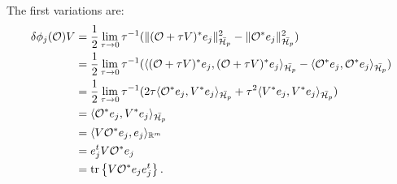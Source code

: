 \documentclass{amsart}
\numberwithin{equation}{section}
\providecommand{\DIFaddbegin}{} %
\providecommand{\DIFaddend}{} %
\providecommand{\DIFdelbegin}{} %
\providecommand{\DIFdelend}{} %
\begin{document}
\DIFaddend The first variations are:
\DIFdelbegin %
\DIFdelend \DIFaddbegin \begin{align*}
  \delta \phi_j(\mathcal{O})V  
  &= \frac12\lim_{\tau \to 0}\tau^{-1}
  ( \|(\mathcal{O} + \tau V)^*e_j \|_{\bar{\mathcal{H}_p}}^2 - \|\mathcal{O} ^*e_j \|_{\bar{\mathcal{H}_p}}^2  ) \\
  &= \frac12\lim_{\tau \to 0}\tau^{-1}
  ( \langle (\mathcal{O} + \tau V)^*e_j, (\mathcal{O} + \tau V)^*e_j \rangle_{\bar{\mathcal{H}_p}} - 
  \langle \mathcal{O}^*e_j, \mathcal{O}^*e_j \rangle_{\bar{\mathcal{H}_p}} ) \\
  &= \frac12\lim_{\tau \to 0}\tau^{-1}
  (2\tau \langle \mathcal{O}^*e_j,V^*e_j \rangle_{\bar{\mathcal{H}_p}} 
  +\tau^2 \langle V^*e_j, V^*e_j \rangle_{\bar{\mathcal{H}_p}} ) \\
  &= \langle \mathcal{O}^*e_j,V^*e_j \rangle_{\bar{\mathcal{H}_p}} \\
  &= \langle V \mathcal{O}^*e_j,e_j \rangle_{\mathbb{R}^m} \\
  &= e_j^t V \mathcal{O}^* e_j \\
  &= \textup{tr}\left \{V \mathcal{O}^* e_je_j^t \right \}.
\end{align*}
\end{document}
